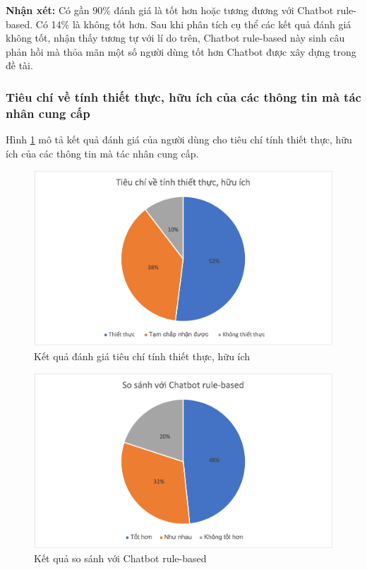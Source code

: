 \textbf{Nhận xét:}
Có gần 90\% đánh giá là tốt hơn hoặc tương đương với Chatbot rule-based. Có 14\% là không tốt hơn. Sau khi phân tích cụ thể các kết quả đánh giá không tốt, nhận thấy tương tự với lí do trên, Chatbot rule-based này sinh câu phản hồi mà thỏa mãn một số người dùng tốt hơn Chatbot được xây dựng trong đề tài.

\subsubsection{Tiêu chí về tính thiết thực, hữu ích của các thông tin mà tác nhân cung cấp}
Hình \ref{fig:tieuchi4} mô tả kết quả đánh giá của người dùng cho tiêu chí tính thiết thực, hữu ích của các thông tin mà tác nhân cung cấp.

\begin{center}
    \begin{figure}[h!]
        \begin{center}
         \includegraphics[scale=0.91]{chapter7/img/tieuchi4.png}
        \end{center}
        \caption{Kết quả đánh giá tiêu chí tính thiết thực, hữu ích}
        \label{fig:tieuchi4}
    \end{figure}
\end{center}

\begin{center}
    \begin{figure}[h!]
        \begin{center}
         \includegraphics[scale=0.91]{chapter7/img/tieuchi4_2.png}
        \end{center}
        \caption{Kết quả so sánh với Chatbot rule-based}
        \label{fig:tieuchi42}
    \end{figure}
\end{center}

